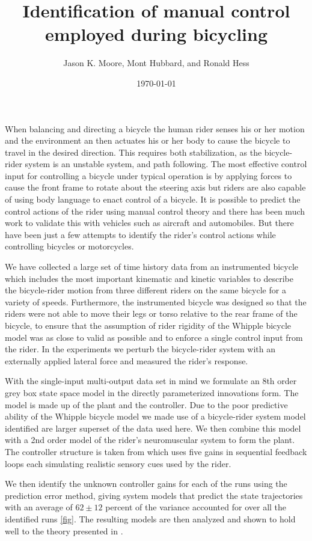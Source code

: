 \documentclass{article}
\title{Identification of manual control employed during bicycling}
\author{Jason K. Moore, Mont Hubbard, and Ronald Hess}
\date{\today}
\begin{document}
\maketitle

When balancing and directing a bicycle the human rider senses his or her motion
and the environment an then actuates his or her body to cause the bicycle to
travel in the desired direction. This requires both  stabilization, as the
bicycle-rider system is an unstable system, and path following. The most
effective control input for controlling a bicycle under typical operation is by
applying forces to cause the front frame to rotate about the steering axis but
riders are also capable of using body language to enact control of a bicycle.
It is possible to predict the control actions of the rider using manual control
theory and there has been much work to validate this with vehicles such as
aircraft and automobiles. But there have been just a few attempts to identify
the rider's control actions while controlling bicycles or motorcycles.

We have collected a large set of time history data from an instrumented bicycle
which includes the most important kinematic and kinetic variables to describe
the bicycle-rider motion from three different riders on the same bicycle for a
variety of speeds. Furthermore, the instrumented bicycle was designed so that
the riders were not able to move their legs or torso relative to the rear frame
of the bicycle, to ensure that the assumption of rider rigidity of the Whipple
bicycle model was as close to valid as possible and to enforce a single control
input from the rider. In the experiments we perturb the bicycle-rider system
with an externally applied lateral force and measured the rider's response.

With the single-input multi-output data set in mind we formulate an 8th order
grey box state space model in the directly parameterized innovations form. The
model is made up of the plant and the controller. Due to the poor predictive
ability of the Whipple bicycle model we made use of a bicycle-rider system
model identified are larger superset of the data used here. We then combine
this model with a 2nd order model of the rider's neuromuscular system to form
the plant. The controller structure is taken from \cite{Hess2012} which uses
five gains in sequential feedback loops each simulating realistic sensory cues
used by the rider.

We then identify the unknown controller gains for each of the runs using the
prediction error method, giving system models that predict the state
trajectories with an average of $62 \pm 12$ percent of the variance accounted
for over all the identified runs \ref{fig}. The resulting models are then
analyzed and shown to hold well to the theory presented in \cite{Hess2012}.
\end{document}
